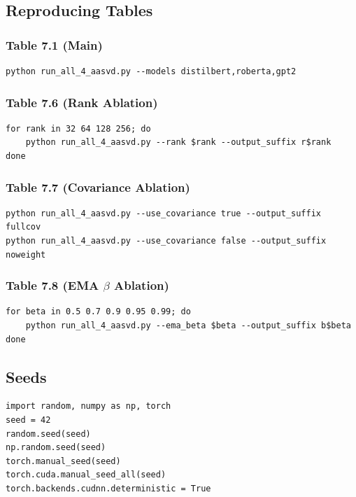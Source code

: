 \subsection{Reproducing Tables}

\subsubsection{Table 7.1 (Main)}

\begin{lstlisting}
python run_all_4_aasvd.py --models distilbert,roberta,gpt2
\end{lstlisting}

\subsubsection{Table 7.6 (Rank Ablation)}

\begin{lstlisting}
for rank in 32 64 128 256; do
    python run_all_4_aasvd.py --rank $rank --output_suffix r$rank
done
\end{lstlisting}

\subsubsection{Table 7.7 (Covariance Ablation)}

\begin{lstlisting}
python run_all_4_aasvd.py --use_covariance true --output_suffix fullcov
python run_all_4_aasvd.py --use_covariance false --output_suffix noweight
\end{lstlisting}

\subsubsection{Table 7.8 (EMA $\beta$ Ablation)}

\begin{lstlisting}
for beta in 0.5 0.7 0.9 0.95 0.99; do
    python run_all_4_aasvd.py --ema_beta $beta --output_suffix b$beta
done
\end{lstlisting}

\subsection{Seeds}

\begin{lstlisting}
import random, numpy as np, torch
seed = 42
random.seed(seed)
np.random.seed(seed)
torch.manual_seed(seed)
torch.cuda.manual_seed_all(seed)
torch.backends.cudnn.deterministic = True
\end{lstlisting}

